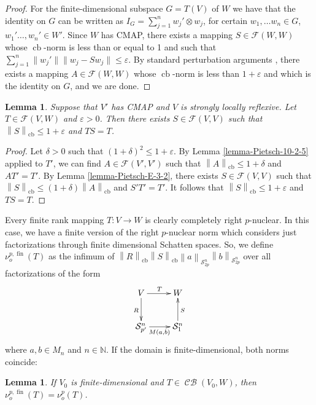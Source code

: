 \documentclass[11pt]{amsart}
\DeclareMathOperator{\cb}{cb}
\DeclareMathOperator{\CB}{\mathcal{CB}}
\DeclareMathOperator{\fin}{fin}
\newcommand{\n}[1]{ \left\|#1\right\| }
\newcommand{\N}{{\mathbb{N}}}
\newtheorem{lemma}[theorem]{Lemma}
\numberwithin{equation}{section}
\begin{document}
\begin{proof}
For the finite-dimensional subspace $G=T(V)$ of $W$ we have that the identity on $G$ can be written as $I_G=\sum_{j=1}^n w_j'\otimes w_j$, for certain $w_1,\dots w_n\in G$, $w_1'\dots, w_n'\in W'$. Since $W$ has CMAP, there  exists a mapping $S \in \mathcal{F}(W,W)$ whose $\cb$-norm is less than or equal to 1 and such that $\sum_{j=1}^n \|w_j'\| \|w_j - Sw_j\|\le \varepsilon$.
By standard perturbation arguments \cite[Lem. 2.13.2]{Pisier-OS-theory}, there exists a mapping $A \in \mathcal{F}(W,W)$ whose $\cb$-norm is less than $1+\varepsilon$ and which is the identity on $G$, and we are done.     
\end{proof}


\begin{lemma}\label{lemma-Pietsch-10-2-6}
Suppose that $V'$ has CMAP and $V$ is strongly locally reflexive. Let $T \in \mathcal{F}(V,W)$ and $\varepsilon>0$.
Then there exists $S \in \mathcal{F}(V,V)$ such that $\n{S}_{\cb} \le 1+\varepsilon$ and $TS=T$.
\end{lemma}

\begin{proof}
Let $\delta>0$ such that $(1+\delta)^2 \le 1+\varepsilon$.
By Lemma \ref{lemma-Pietsch-10-2-5} applied to $T'$, we can find $A \in \mathcal{F}(V',V')$ such that $\n{A}_{\cb} \le 1+\delta$ and $AT' =T'$.
By Lemma \ref{lemma-Pietsch-E-3-2}, there exists $S \in\mathcal{F}(V,V)$ such that $\n{S}_{\cb} \le (1+\delta)\n{A}_{\cb}$ and $S'T' = T'$.
It follows that $\n{S}_{\cb} \le 1+\varepsilon$ and $TS=T$.
\end{proof}

Every finite rank mapping $T : V \to W$ is clearly completely right $p$-nuclear. In this case, we have a finite version of the right $p$-nuclear norm which considers just factorizations through finite dimensional Schatten spaces. So, we define $\nu^{p,\fin}_o(T)$ as the infimum of $\n{R}_{\cb} \n{S}_{\cb} \n{a}_{\mathcal{S}^n_{2p}} \n{b}_{\mathcal{S}^n_{2p}}$ over all factorizations of the form
\[
\xymatrix{
V \ar[r]^T \ar[d]_{R} &W \\
\mathcal{S}^n_{p'} \ar[r]_{M(a,b)} &\mathcal{S}^n_1 \ar[u]_{S}
}
\]
where $a,b\in M_n$ and $n\in\N$. If the domain is finite-dimensional, both norms coincide:


\begin{lemma}\label{lemma-finite-right-p-nuclear}
If $V_0$  is finite-dimensional and $T \in \CB(V_0,W)$, then $\nu^{p,\fin}_o(T) = \nu^p_o(T)$.   
\end{lemma}
\end{document}

